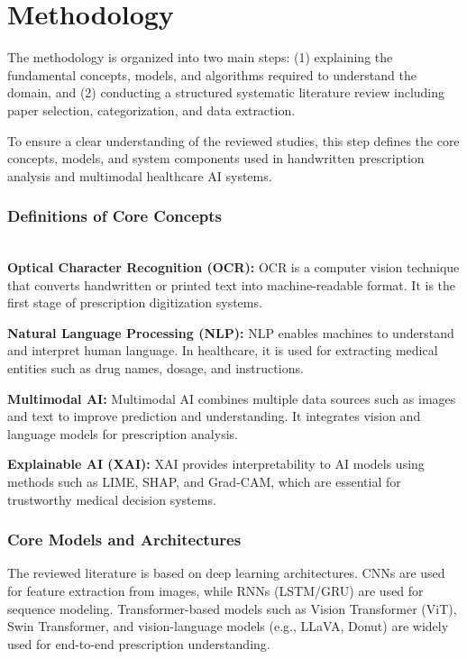 \documentclass[conference]{IEEEtran}
\begin{document}
\section{Methodology}
\label{sec:methodology}

The methodology is organized into two main steps: (1) explaining the fundamental concepts, models, and algorithms required to understand the domain, and (2) conducting a structured systematic literature review including paper selection, categorization, and data extraction.


To ensure a clear understanding of the reviewed studies, this step defines the core concepts, models, and system components used in handwritten prescription analysis and multimodal healthcare AI systems.

\subsubsection{Definitions of Core Concepts}\\

\textbf{Optical Character Recognition (OCR):}
OCR is a computer vision technique that converts handwritten or printed text into machine-readable format. It is the first stage of prescription digitization systems.

\textbf{Natural Language Processing (NLP):}
NLP enables machines to understand and interpret human language. In healthcare, it is used for extracting medical entities such as drug names, dosage, and instructions.

\textbf{Multimodal AI:}
Multimodal AI combines multiple data sources such as images and text to improve prediction and understanding. It integrates vision and language models for prescription analysis.

\textbf{Explainable AI (XAI):}
XAI provides interpretability to AI models using methods such as LIME, SHAP, and Grad-CAM, which are essential for trustworthy medical decision systems.

\subsubsection{Core Models and Architectures}

The reviewed literature is based on deep learning architectures. CNNs are used for feature extraction from images, while RNNs (LSTM/GRU) are used for sequence modeling. Transformer-based models such as Vision Transformer (ViT), Swin Transformer, and vision-language models (e.g., LLaVA, Donut) are widely used for end-to-end prescription understanding.
\end{document}
